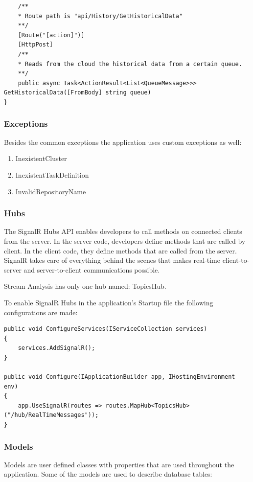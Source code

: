 \begin{enumerate}
\begin{lstlisting}
	/**
	* Route path is "api/History/GetHistoricalData"
	**/
	[Route("[action]")]
	[HttpPost]
	/**
	* Reads from the cloud the historical data from a certain queue.
	**/
	public async Task<ActionResult<List<QueueMessage>>> GetHistoricalData([FromBody] string queue)
}
\end{lstlisting}

\end{enumerate}

\subsubsection{Exceptions}
\label{chap:04:02:03:02}
Besides the common exceptions the application uses custom exceptions as well:
\begin{enumerate}
	\item InexistentCluster
	\item InexistentTaskDefinition 
	\item InvalidRepositoryName
\end{enumerate}

\subsubsection{Hubs}
\label{chap:04:02:03:03}
The SignalR Hubs API enables developers to call methods on connected clients from the server. In the server code, developers define methods that are called by client. In the client code, they define methods that are called from the server. SignalR takes care of everything behind the scenes that makes real-time client-to-server and server-to-client communications possible.

Stream Analysis has only one hub named: TopicsHub.

To enable SignalR Hubs in the application's Startup file the following configurations are made:

\begin{lstlisting}
public void ConfigureServices(IServiceCollection services)
{
	services.AddSignalR();
}

public void Configure(IApplicationBuilder app, IHostingEnvironment env)
{
	app.UseSignalR(routes => routes.MapHub<TopicsHub>("/hub/RealTimeMessages"));
}
\end{lstlisting}

\subsubsection{Models}
\label{chap:04:02:03:04}
Models are user defined classes with properties that are used throughout the application. Some of the models are used to describe database tables:

